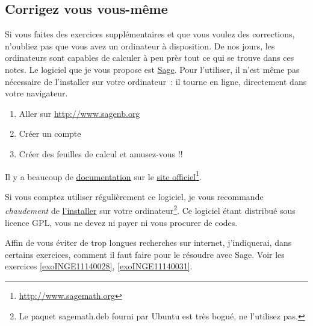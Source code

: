 

\subsection{Corrigez vous vous-même}

Si vous faites des exercices supplémentaires et que vous voulez des corrections, n'oubliez pas que vous avez un ordinateur à disposition. De nos jours, les ordinateurs sont capables de calculer à peu près tout ce qui se trouve dans ces notes. Le logiciel que je vous propose est \href{http://www.sagemath.org}{Sage}. Pour l'utiliser, il n'est même pas nécessaire de l'installer sur votre ordinateur~: il tourne en ligne, directement dans votre navigateur.

\begin{enumerate}

	\item
		Aller sur \href{http://www.sagenb.org}{http://www.sagenb.org}
	\item
		Créer un compte
	\item
		Créer des feuilles de calcul et amusez-vous !!

\end{enumerate}

Il y a beaucoup de \href{http://lmgtfy.com/?q=sage+documentation}{documentation} sur le \href{http://www.sagemath.org}{site officiel}\footnote{\href{http://www.sagemath.org}{http://www.sagemath.org}}.


Si vous comptez utiliser régulièrement ce logiciel, je vous recommande \emph{chaudement} de \href{http://mirror.switch.ch/mirror/sagemath/index.html}{l'installer} sur votre ordinateur\footnote{Le paquet sagemath.deb fourni par Ubuntu est très bogué, ne l'utilisez pas.}. Ce logiciel étant distribué sous licence GPL, vous ne devez ni payer ni vous procurer de codes.


Affin de vous éviter de trop longues recherches sur internet, j'indiquerai, dans certains exercices, comment il faut faire pour le résoudre avec Sage.  	 Voir les exercices \ref{exoINGE11140028}, \ref{exoINGE11140031}.

